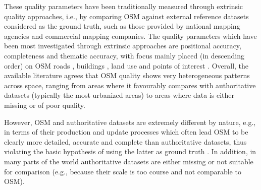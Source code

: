 \documentclass{Configuration_Files/PoliMi3i_thesis}
\begin{document}
These quality parameters have been traditionally measured through extrinsic quality approaches, i.e., by comparing OSM against external reference datasets considered as the ground truth, such as those provided by national mapping agencies and commercial mapping companies. The quality parameters which have been most investigated through extrinsic approaches are positional accuracy, completeness and thematic accuracy, with focus mainly placed (in descending order) on OSM 
roads \cite{haklayHowGoodVolunteered2010, canavosio-zuzelskiPhotogrammetricApproachAssessing2013, graserOSMGoodEnough2015, brovelliAutomatedComparisonOpenStreetMap2017,  barrington-leighWorldUsergeneratedRoad2017},
buildings \cite{hechtMeasuringCompletenessBuilding2013, fanQualityAssessmentBuilding2014,  framAssessingQualityOpenStreetMap2015, brovelliPositionalAccuracyAssessment2016},
land use \cite{estimaInvestigatingPotentialOpenStreetMap2015, jokararsanjaniEmergenceEvolutionOpenStreetMap2015, fonteUsingOpenStreetMapCreate2017}
and points of interest \cite{girresQualityAssessmentFrench2010, jacksonAssessingCompletenessSpatial2013}. Overall, the available literature agrees that OSM quality shows very heterogeneous patterns across space, ranging from areas where it favourably compares with authoritative datasets (typically the most urbanized areas) to areas where data is either missing or of poor quality.

However, OSM and authoritative datasets are extremely different by nature, e.g., in terms of their production and update processes which often lead OSM to be clearly more detailed, accurate and complete than authoritative datasets, thus violating the basic hypothesis of using the latter as ground truth \cite{antoniouMeasuresIndicatorsVGI2015}. In addition, in many parts of the world authoritative datasets are either missing or not suitable for comparison (e.g., because their scale is too course and not comparable to OSM).
\end{document}
